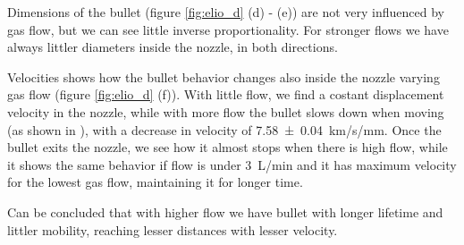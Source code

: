 Dimensions of the bullet (figure \ref{fig:elio_d} (d) - (e)) are not very  influenced by gas flow, but we can see little inverse proportionality. For stronger flows we have always littler diameters inside the nozzle, in both directions.

Velocities shows how the bullet behavior changes also inside the nozzle varying gas flow (figure \ref{fig:elio_d} (f)). With little flow, we find a costant displacement velocity in the nozzle, while with more flow the bullet slows down when moving (as shown in \cite{Jarrige_2010}), with a decrease in velocity of \SI{7.58(4)}{\kilo\meter/\second/\milli\meter}.
Once the bullet exits the nozzle, we see how it almost stops when there is high flow, while it shows the same behavior if flow is under \SI{3}{\liter/\minute} and it has maximum velocity for the lowest gas flow, maintaining it for longer time.


Can be concluded that with higher flow we have bullet with longer lifetime and littler mobility, reaching lesser distances with lesser velocity.


